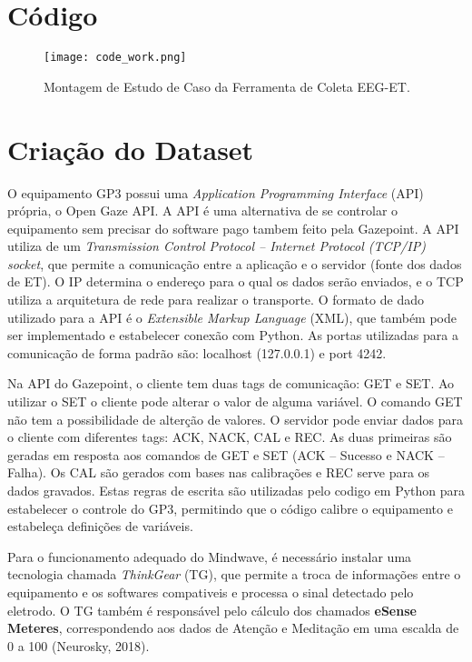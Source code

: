 \section{Código}

\begin{figure}
    \centering
    \texttt{[image: code\_work.png]}
    \caption{Montagem de Estudo de Caso da Ferramenta de Coleta EEG-ET.}
\end{figure}






\section{Criação do Dataset}
O equipamento GP3 possui uma \textit{Application Programming Interface} (API) própria, 
o Open Gaze API. 
A API é uma alternativa de se controlar o equipamento sem precisar do software 
pago tambem feito pela Gazepoint. A API utiliza de um \textit{Transmission Control Protocol – Internet Protocol (TCP/IP) 
socket}, que permite a comunicação entre a aplicação e o servidor (fonte dos dados de ET). 
O IP determina o endereço para o qual os dados serão enviados, e o TCP utiliza a arquitetura de 
rede para realizar o transporte. O formato de dado utilizado para a API é o \textit{Extensible Markup Language} (XML), 
que também pode ser implementado e estabelecer conexão com Python. 
As portas utilizadas para a comunicação de forma padrão são: 
localhost (127.0.0.1) e port 4242. 

Na API do Gazepoint, o cliente tem duas tags de comunicação: GET e SET. 
Ao utilizar o SET o cliente pode alterar o valor de alguma variável. 
O comando GET não tem a possibilidade de alterção de valores. O servidor 
pode enviar dados para o cliente com diferentes tags: ACK, NACK, CAL e REC. 
As duas primeiras são geradas em resposta aos comandos de GET e SET (ACK – Sucesso e NACK –Falha). 
Os CAL são gerados com bases nas calibrações e REC serve para os dados gravados. 
Estas regras de escrita são utilizadas pelo codigo em Python para estabelecer o controle do GP3,
 permitindo que o código calibre o equipamento e estabeleça definições de variáveis.

Para o funcionamento adequado do Mindwave, é necessário instalar uma tecnologia chamada \textit{ThinkGear} (TG), 
que permite a troca de informações entre o equipamento e os softwares compativeis e processa o 
sinal detectado pelo eletrodo. O TG também é responsável pelo cálculo dos chamados \textbf{eSense Meteres}, 
correspondendo aos dados de Atenção e Meditação em uma escalda de 0 a 100 (Neurosky, 2018). 

